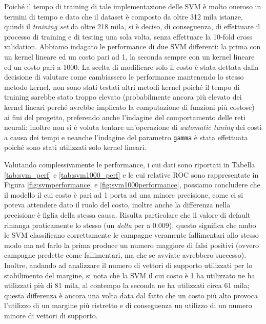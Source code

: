 Poiché il tempo di training di tale implementazione delle SVM è molto oneroso in termini di tempo e dato che il dataset è composto da oltre 312 mila istanze, quindi il \textit{training set} da oltre 218 mila, si è deciso, di conseguenza, di effettuare il processo di training e di testing una sola volta, senza effettuare la 10-fold cross validation.
Abbiamo indagato le performance di due SVM differenti: la prima con un kernel lineare ed un costo pari ad 1, la seconda sempre con un kernel lineare ed un costo pari a 1000. 
La scelta di modificare solo il costo è stata dettata dalla decisione di valutare come cambiassero le performance mantenendo lo stesso metodo kernel, non sono stati testati altri metodi kernel poiché il tempo di training sarebbe stato troppo elevato (probabilmente ancora più elevato dei kernel lineari perché avrebbe implicato la computazione di funzioni più costose) ai fini del progetto, preferendo anche l'indagine del comportamento delle reti neurali; inoltre non si è voluta tentare un'operazione di \textit{automatic tuning} dei costi a causa dei tempi e neanche l'indagine del parametro \texttt{gamma} è stata effettuata poiché sono stati utilizzati solo kernel lineari.

Valutando complessivamente le performance, i cui dati sono riportati in Tabella \ref{tab:svm_perf} e \ref{tab:svm1000_perf} e le cui relative ROC sono rappresentate in Figura \ref{fig:svmperformance} e \ref{fig:svm1000performance}, possiamo concludere che il modello il cui costo è pari ad 1 porta ad una minore precisione, come ci si poteva attendere dato il ruolo del costo, inoltre anche la differenza nella precisione è figlia della stessa causa.
Risulta particolare che il valore di default rimanga praticamente lo stesso (un \textit{delta} per a 0.009), questo significa che ambo le SVM classificano correttamente le campagne veramente fallimentari allo stesso modo ma nel farlo la prima produce un numero maggiore di falsi positivi (ovvero campagne predette come fallimentari, ma che se avviate avrebbero successo). 
Inoltre, andando ad analizzare il numero di vettori di supporto utilizzati per lo stabilimento del margine, si nota che la SVM il cui costo è 1 ha utilizzato ne ha utilizzati più di 81 mila, al contempo la seconda ne ha utilizzati circa 61 mila; questa differenza è ancora una volta data dal fatto che un costo più alto provoca l'utilizzo di un margine più ristretto e di conseguenza un utilizzo di un numero minore di vettori di supporto.

